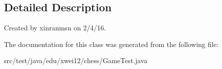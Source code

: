 \subsection{Detailed Description}
Created by xinranmsn on 2/4/16. 

The documentation for this class was generated from the following file\+:\begin{DoxyCompactItemize}
\item 
src/test/java/edu/xwei12/chess/Game\+Test.\+java\end{DoxyCompactItemize}
